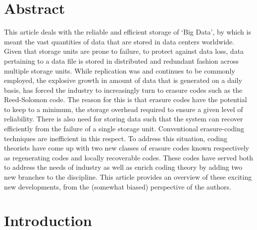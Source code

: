 \begin{multicols}{2}
\setcounter{figure}{0}
\section*{Abstract}
\vskip -0.2cm

\noindent
This article deals with the reliable and efficient storage of `Big Data', by which is meant the vast quantities of data that are stored in data centers worldwide.  Given that storage units are prone to failure, to protect against data loss, data pertaining to a data file is stored in distributed and redundant fashion across multiple storage units.  While replication was and continues to be commonly employed, the explosive growth in amount of data that is generated on a daily basis, has forced the industry to increasingly turn to erasure codes such as the Reed-Solomon code.  The reason for this is that erasure codes have the potential to keep to a minimum, the storage overhead required to ensure a given level of reliability.  There is also need for storing data such that the system can recover efficiently from the failure of a single storage unit.  Conventional erasure-coding techniques are inefficient in this respect.  To address this situation, coding theorists have come up with two new classes of erasure codes known respectively as regenerating codes and locally recoverable codes. These codes have served both to address the needs of industry as well as enrich coding theory by adding two new branches to the discipline.  This article provides an overview of these exciting new developments, from the (somewhat biased) perspective of the authors.
\vskip -20pt

\section{Introduction}
\vskip -0.2cm
	

\end{multicols}
